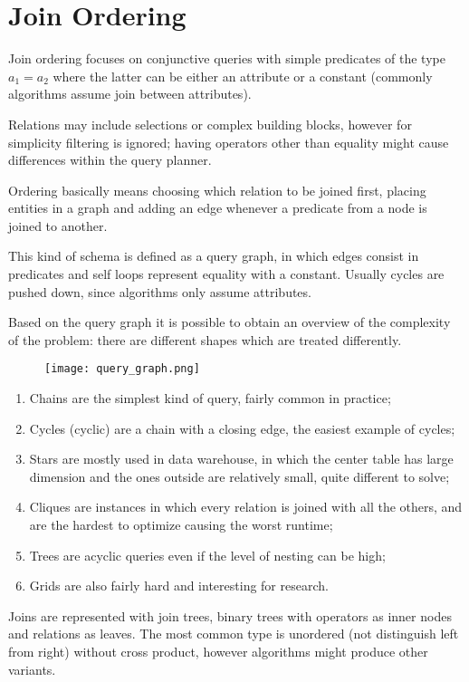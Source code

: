 \section{Join Ordering}
Join ordering focuses on conjunctive queries with simple predicates of the type $a_1 = a_2$ where the latter can be either an attribute or a constant (commonly algorithms assume join between attributes).

Relations may include selections or complex building blocks, however for simplicity filtering is ignored; having operators other than equality might cause differences within the query planner.

Ordering basically means choosing which relation to be joined first, placing entities in a graph and adding an edge whenever a predicate from a node is joined to another. 

This kind of schema is defined as a query graph, in which edges consist in predicates and self loops represent equality with a constant. Usually cycles are pushed down, since algorithms only assume attributes. 

Based on the query graph it is possible to obtain an overview of the complexity of the problem: there are different shapes which are treated differently. 

\begin{figure}[h]
	\texttt{[image: query\_graph.png]}
	\centering
\end{figure}

\begin{enumerate}
	\item Chains are the simplest kind of query, fairly common in practice;
	\item Cycles (cyclic) are a chain with a closing edge, the easiest example of cycles;
	\item Stars are mostly used in data warehouse, in which the center table has large dimension and the ones outside are relatively small, quite different to solve;
	\item Cliques are instances in which every relation is joined with all the others, and are the hardest to optimize causing the worst runtime;
	\item Trees are acyclic queries even if the level of nesting can be high;
	\item Grids are also fairly hard and interesting for research.
\end{enumerate}

Joins are represented with join trees, binary trees with operators as inner nodes and relations as leaves. The most common type is unordered (not distinguish left from right) without cross product, however algorithms might produce other variants.

